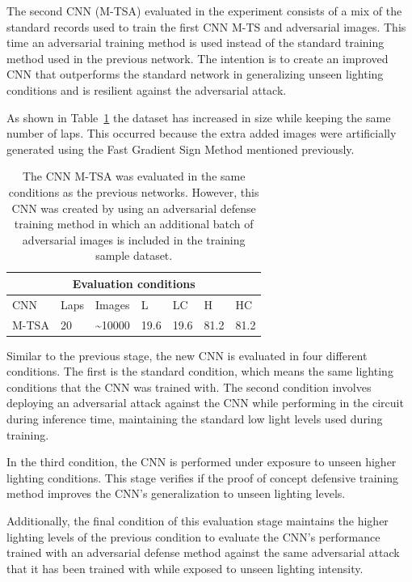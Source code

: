 \documentclass[12pt]{article}
\begin{document}
The second CNN (M-TSA) evaluated in the experiment consists of a mix of the standard records used to train the first CNN M-TS and adversarial images. This time an adversarial training method is used instead of the standard training method used in the previous network. The intention is to create an improved CNN that outperforms the standard network in generalizing unseen lighting conditions and is resilient against the adversarial attack.

As shown in Table~\ref{tab:test3method} the dataset has increased in size while keeping the same number of laps. This occurred because the extra added images were artificially generated using the Fast Gradient Sign Method mentioned previously.

\begin{table}[h]
\begin{center}
\begin{tabular}{ |p{3cm}|p{1cm}|p{2cm}|p{1cm}|p{1cm}|p{1cm}|p{1cm}|  }
 \hline
 \multicolumn{7}{|c|}{Evaluation conditions} \\
 \hline
 CNN & Laps & Images & L  & LC  & H  & HC \\
 \hline
 M-TSA & 20 & \textasciitilde10000 & 19.6  & 19.6  & 81.2 & 81.2\\
\hline
\end{tabular}
\caption{\label{tab:test3method}The CNN M-TSA was evaluated in the same conditions as the previous networks. However, this CNN was created by using an adversarial defense training method in which an additional batch of adversarial images is included in the training sample dataset.}
\end{center}
\end{table}

Similar to the previous stage, the new CNN is evaluated in four different conditions. The first is the standard condition, which means the same lighting conditions that the CNN was trained with. The second condition involves deploying an adversarial attack against the CNN while performing in the circuit during inference time, maintaining the standard low light levels used during training. 

In the third condition, the CNN is performed under exposure to unseen higher lighting conditions. This stage verifies if the proof of concept defensive training method improves the CNN's generalization to unseen lighting levels. 

Additionally, the final condition of this evaluation stage maintains the higher lighting levels of the previous condition to evaluate the CNN's performance trained with an adversarial defense method against the same adversarial attack that it has been trained with while exposed to unseen lighting intensity. 
\end{document}
